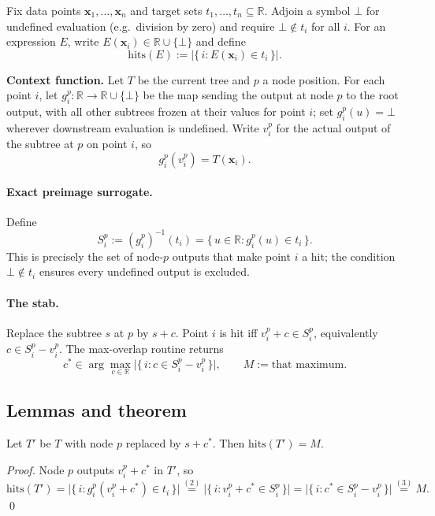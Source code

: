 \documentclass{llncs}
\begin{document}
Fix data points $\mathbf{x}_1,\dots,\mathbf{x}_n$ and target sets
$t_1,\dots,t_n \subseteq \mathbb{R}$. Adjoin a symbol $\bot$ for undefined
evaluation (e.g.\ division by zero) and require $\bot \notin t_i$ for all $i$.
For an expression $E$, write $E(\mathbf{x}_i) \in \mathbb{R}\cup\{\bot\}$ and define
\[
  \text{hits}(E) := \bigl|\{\, i : E(\mathbf{x}_i) \in t_i \,\}\bigr|.
\]

\textbf{Context function.} Let $T$ be the current tree and $p$ a node position.
For each point $i$, let $g_i^p : \mathbb{R} \to \mathbb{R}\cup\{\bot\}$ be the map
sending the output at node $p$ to the root output, with all other subtrees frozen at
their values for point $i$; set $g_i^p(u)=\bot$ wherever downstream evaluation is
undefined. Write $v_i^p$ for the actual output of the subtree at $p$ on point $i$, so
\[
  g_i^p(v_i^p) = T(\mathbf{x}_i). \tag{1}
\]

\paragraph{Exact preimage surrogate.} Define
\[
  S_i^p := (g_i^p)^{-1}(t_i) = \{\, u \in \mathbb{R} : g_i^p(u) \in t_i \,\}. \tag{2}
\]
This is precisely the set of node-$p$ outputs that make point $i$ a hit; the
condition $\bot\notin t_i$ ensures every undefined output is excluded.

\paragraph{The stab.} Replace the subtree $s$ at $p$ by $s+c$. Point $i$ is hit iff
$v_i^p + c \in S_i^p$, equivalently $c \in S_i^p - v_i^p$. The max-overlap routine
returns
\[
  c^\ast \in \arg\max_{c\in\mathbb{R}}
  \bigl|\{\, i : c \in S_i^p - v_i^p \,\}\bigr|,
  \qquad M := \text{that maximum.} \tag{3}
\]

\subsection{Lemmas and theorem}

\begin{lemma}
\label{lem:stab}
Let $T'$ be $T$ with node $p$ replaced by $s + c^\ast$. Then $\mathrm{hits}(T') = M$.
\end{lemma}
\begin{proof}
Node $p$ outputs $v_i^p + c^\ast$ in $T'$, so
\[
  \mathrm{hits}(T')
  = \bigl|\{\, i : g_i^p(v_i^p + c^\ast)\in t_i \,\}\bigr|
  \overset{(2)}{=} \bigl|\{\, i : v_i^p + c^\ast \in S_i^p \,\}\bigr|
  = \bigl|\{\, i : c^\ast \in S_i^p - v_i^p \,\}\bigr|
  \overset{(3)}{=} M.
\]
\qed
\end{proof}
\end{document}
